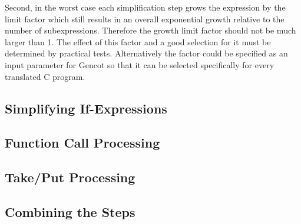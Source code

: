 Second, in the worst case each simplification step grows the expression by the limit factor which still results in an overall exponential growth
relative to the number of subexpressions. Therefore the growth limit factor should not be much larger than 1. The effect of this
factor and a good selection for it must be determined by practical tests. Alternatively the factor could be specified as an input 
parameter for Gencot so that it can be selected specifically for every translated C program.

\subsection{Simplifying If-Expressions}
\label{imp-post-if}

\subsection{Function Call Processing}
\label{imp-post-funcall}

\subsection{Take/Put Processing}
\label{imp-post-takeput}

\subsection{Combining the Steps}
\label{imp-post-combine}

